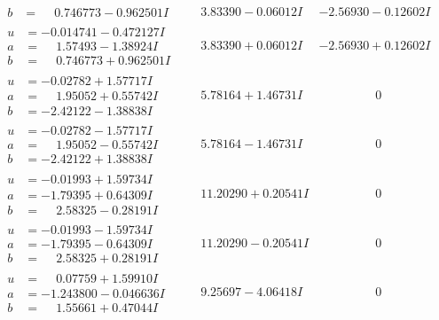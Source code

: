 \documentclass[1p]{elsarticle_modified}
\theoremstyle{definition}
\begin{document}
$$\begin{array}{c|c|c}
\begin{aligned}
b &= \phantom{-}0.746773 - 0.962501 I\end{aligned}
 & \phantom{-}3.83390 - 0.06012 I & -2.56930 - 0.12602 I \\ \hline\begin{aligned}
u &= -0.014741 - 0.472127 I \\
a &= \phantom{-}1.57493 - 1.38924 I \\
b &= \phantom{-}0.746773 + 0.962501 I\end{aligned}
 & \phantom{-}3.83390 + 0.06012 I & -2.56930 + 0.12602 I \\ \hline\begin{aligned}
u &= -0.02782 + 1.57717 I \\
a &= \phantom{-}1.95052 + 0.55742 I \\
b &= -2.42122 - 1.38838 I\end{aligned}
 & \phantom{-}5.78164 + 1.46731 I & \phantom{-0.000000 } 0 \\ \hline\begin{aligned}
u &= -0.02782 - 1.57717 I \\
a &= \phantom{-}1.95052 - 0.55742 I \\
b &= -2.42122 + 1.38838 I\end{aligned}
 & \phantom{-}5.78164 - 1.46731 I & \phantom{-0.000000 } 0 \\ \hline\begin{aligned}
u &= -0.01993 + 1.59734 I \\
a &= -1.79395 + 0.64309 I \\
b &= \phantom{-}2.58325 - 0.28191 I\end{aligned}
 & \phantom{-}11.20290 + 0.20541 I & \phantom{-0.000000 } 0 \\ \hline\begin{aligned}
u &= -0.01993 - 1.59734 I \\
a &= -1.79395 - 0.64309 I \\
b &= \phantom{-}2.58325 + 0.28191 I\end{aligned}
 & \phantom{-}11.20290 - 0.20541 I & \phantom{-0.000000 } 0 \\ \hline\begin{aligned}
u &= \phantom{-}0.07759 + 1.59910 I \\
a &= -1.243800 - 0.046636 I \\
b &= \phantom{-}1.55661 + 0.47044 I\end{aligned}
 & \phantom{-}9.25697 - 4.06418 I & \phantom{-0.000000 } 0 \\ \hline\begin{aligned}

\end{aligned}
\end{array}$$
\end{document}
